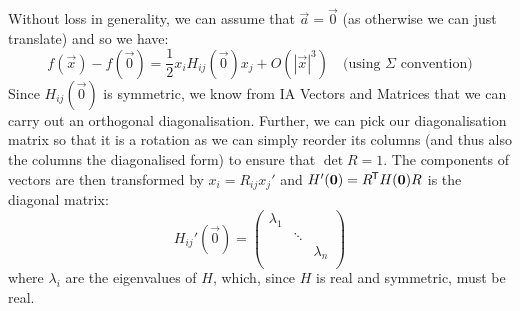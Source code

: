 \documentclass[../main.tex]{subfiles}
\begin{document}
Without loss in generality, we can assume that $\vec{a} = \vec{0}$ (as otherwise we can just translate) and so we have:
\[
  f(\vec{x}) - f(\vec{0}) = \frac{1}{2}x_i H_{i j}(\vec{0})x_j + O(|\vec{x}|^3) \quad  \text{(using $\Sigma$ convention)}
\]
Since $H_{i j}(\vec{0})$ is symmetric, we know from IA Vectors and Matrices that we can carry out an orthogonal diagonalisation.
Further, we can pick our diagonalisation matrix so that it is a rotation as we can simply reorder its columns (and thus also the columns the diagonalised form) to ensure that $\det R = 1$.
The components of vectors are then transformed by $x_i = R_{i j}x_j'$ and $H'(\mathbf{\bm{0}}) = R^{{\mkern-1.5mu\mathsf{T}}} H(\mathbf{\bm{0}}) R$ is the diagonal matrix:
\[
  H_{i j}'(\vec{0}) = \begin{pmatrix}
  \lambda_1 &  &  \\
   & \ddots &  \\
   &  & \lambda_n \\
  \end{pmatrix}
\]
where $\lambda_i$ are the eigenvalues of $H$, which, since $H$ is real and symmetric, must be real.
\end{document}
